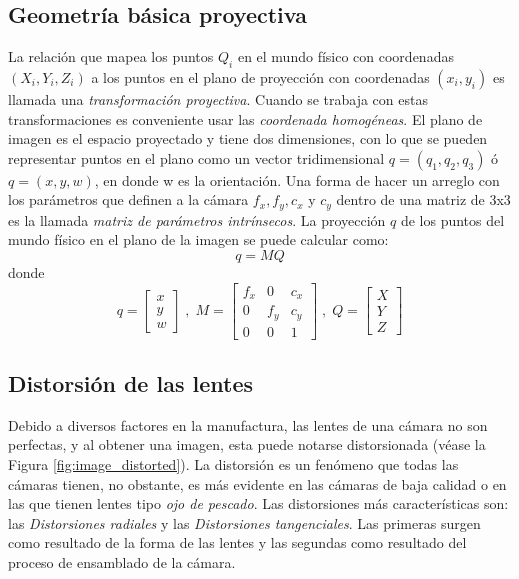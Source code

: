 		\subsection*{Geometría básica proyectiva}
La relación que mapea los puntos $Q_{i}$ en el mundo físico con coordenadas $(X_{i},Y_{i},Z_{i})$ a los puntos en el plano de proyección con coordenadas $(x_{i},y_{i})$ es llamada una \textit{transformación proyectiva}. Cuando se trabaja con estas transformaciones es conveniente usar las \textit{coordenada homogéneas}. El plano de imagen es el espacio proyectado y tiene dos dimensiones, con lo que se pueden representar puntos en el plano como un vector tridimensional $q=(q_{1},q_{2},q_{3})$ ó $q=(x, y, w)$, en donde w es la orientación. Una forma de hacer un arreglo con los parámetros que definen a la cámara $f_{x},f_{y},c_{x}$ y $c_{y}$ dentro de una matriz de 3x3 es la llamada \textit{matriz de parámetros intrínsecos}. La proyección $q$ de los puntos del mundo físico en el plano de la imagen se puede calcular como: 
\[q=MQ\]
donde
\[q=
\begin{bmatrix}
x\\ 
y\\
w 
\end{bmatrix}\;,\;M=
\begin{bmatrix}
f_{x} & 0 & c_{x}\\ 
0     &f_{y}&c_{y} \\
0     & 0 & 1
\end{bmatrix}\;,\;Q=
\begin{bmatrix}
X\\
Y\\
Z
\end{bmatrix}
\]
		\subsection*{Distorsión de las lentes}
Debido a diversos factores en la manufactura, las lentes de una cámara no son perfectas, y al obtener una imagen, esta puede notarse distorsionada (véase la Figura \ref{fig:image_distorted}). La distorsión es un fenómeno que todas las cámaras tienen, no obstante, es más evidente en las cámaras de baja calidad o en las que tienen lentes tipo \textit{ojo de pescado}. Las distorsiones más características son: las \textit{Distorsiones radiales} y las \textit{Distorsiones tangenciales}. Las primeras surgen como resultado de la forma de las lentes y las segundas como resultado del proceso de ensamblado de la cámara.

